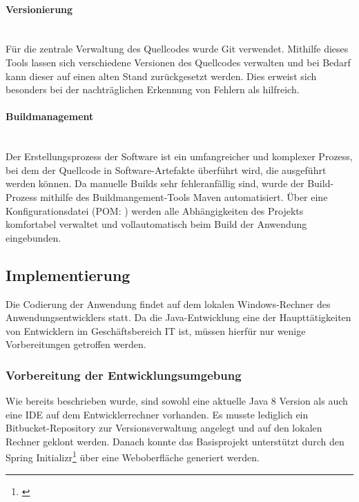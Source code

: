 \paragraph{Versionierung} ~\\
\label{p:Versionierung}
Für die zentrale Verwaltung des Quellcodes wurde Git verwendet. Mithilfe dieses Tools lassen sich verschiedene Versionen des Quellcodes verwalten und bei Bedarf kann dieser auf einen alten Stand zurückgesetzt werden. Dies erweist sich besonders bei der nachträglichen Erkennung von Fehlern als hilfreich.

\paragraph{Buildmanagement} ~\\
\label{p:Buildmangement}
Der Erstellungsprozess der Software ist ein umfangreicher und komplexer Prozess, bei dem der Quellcode in Software-Artefakte überführt wird, die ausgeführt werden können. Da manuelle Builds sehr fehleranfällig sind, wurde der Build-Prozess mithilfe des Buildmangement-Tools Maven automatisiert. Über eine Konfigurationsdatei (\acs{POM}: ) werden alle Abhängigkeiten des Projekts komfortabel verwaltet und vollautomatisch beim Build der Anwendung eingebunden.


\subsection{Implementierung} 
\label{sec:Implementierung}
Die Codierung der Anwendung findet auf dem lokalen Windows-Rechner des Anwendungsentwicklers statt. Da die Java-Entwicklung eine der Haupttätigkeiten von Entwicklern im Geschäftsbereich IT ist, müssen hierfür nur wenige Vorbereitungen getroffen werden.

\subsubsection{Vorbereitung der Entwicklungsumgebung}
\label{sec:Entwicklungsumgebung}
Wie bereits beschrieben wurde, sind sowohl eine aktuelle Java 8 Version als auch eine \ac{IDE} auf dem Entwicklerrechner vorhanden. Es musste lediglich ein Bitbucket-Repository zur Versionsverwaltung angelegt und auf den lokalen Rechner geklont werden. Danach konnte das Basisprojekt unterstützt durch den Spring Initializr\footnote{\cite{spring:init}} über eine Weboberfläche generiert werden.

